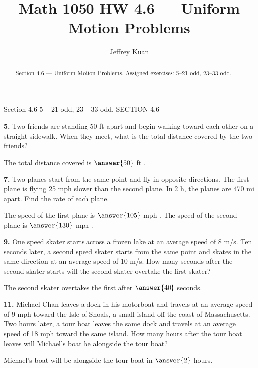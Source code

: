 \documentclass{ximera}
\author{Jeffrey Kuan}
\title{Math 1050 HW 4.6 --- Uniform Motion Problems}
\begin{document}
\begin{abstract}
    Section 4.6 --- Uniform Motion Problems.
    Assigned exercises: 5–21 odd, 23–33 odd.
\end{abstract}

\maketitle

Section 4.6 5 – 21 odd, 23 – 33 odd. SECTION 4.6

\begin{problem}
\textbf{5.} Two friends are standing 50 ft apart and begin walking toward each other on a
  straight sidewalk. When they meet, what is the total distance covered by the two
  friends?

The total distance covered is $\answer{50}$ ft .
\end{problem}

\begin{problem}
\textbf{7.} Two planes start from the same point and fly in opposite directions. The first
  plane is flying 25 mph slower than the second plane. In 2 h, the planes are 470 mi
  apart. Find the rate of each plane.

The speed of the first plane is $\answer{105}$ mph . The speed of the second plane is $\answer{130}$ mph .
\end{problem}

\begin{problem}
\textbf{9.} One speed skater starts across a frozen lake at an average speed of 8 m/s. Ten
  seconds later, a second speed skater starts from the same point and skates in the same
  direction at an average speed of 10 m/s. How many seconds after the second skater
  starts will the second skater overtake the first skater?

The second skater overtakes the first after $\answer{40}$ seconds.
\end{problem}

\begin{problem}
\textbf{11.} Michael Chan leaves a dock in his motorboat and travels at an average speed of
  9 mph toward the Isle of Shoals, a small island off the coast of Massachusetts. Two
  hours later, a tour boat leaves the same dock and travels at an average speed of 18 mph
  toward the same island. How many hours after the tour boat leaves will Michael's boat be
  alongside the tour boat?

Michael's boat will be alongside the tour boat in $ \answer{2}$ hours.
\end{problem}
\end{document}
